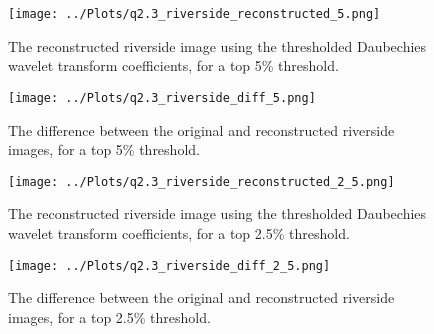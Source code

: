 \documentclass[12pt]{report} %
\begin{document}
\begin{figure}[htbp]
    \centering
    \texttt{[image: ../Plots/q2.3\_riverside\_reconstructed\_5.png]}
    \caption{The reconstructed riverside image using the thresholded Daubechies wavelet transform coefficients, for a top 5\% threshold.}
    \label{fig:reconstructed_image5}
\end{figure}

\begin{figure}[htbp]
    \centering
    \texttt{[image: ../Plots/q2.3\_riverside\_diff\_5.png]}
    \caption{The difference between the original and reconstructed riverside images, for a top 5\% threshold.}
    \label{fig:diff_image5}
\end{figure}

\begin{figure}[htbp]
    \centering
    \texttt{[image: ../Plots/q2.3\_riverside\_reconstructed\_2\_5.png]}
    \caption{The reconstructed riverside image using the thresholded Daubechies wavelet transform coefficients, for a top 2.5\% threshold.}
    \label{fig:reconstructed_image2.5}
\end{figure}

\begin{figure}[htbp]
    \centering
    \texttt{[image: ../Plots/q2.3\_riverside\_diff\_2\_5.png]}
    \caption{The difference between the original and reconstructed riverside images, for a top 2.5\% threshold.}
    \label{fig:diff_image2.5}
\end{figure}





\end{document}
